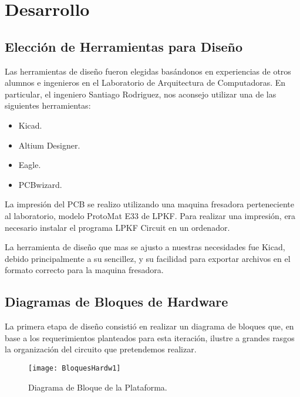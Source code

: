 
\section{Desarrollo} %
\label{it3:sec:desarrollo}

\subsection{Elección de Herramientas para Diseño} %
\label{it3:sub:herramientas_para_diseno}

Las herramientas de diseño fueron elegidas basándonos en experiencias de otros alumnos e ingenieros en el Laboratorio de Arquitectura de Computadoras. En particular, el ingeniero Santiago Rodriguez, nos aconsejo utilizar una de las siguientes herramientas:

\begin{itemize}
\item Kicad.
\item Altium Designer.
\item Eagle.
\item PCBwizard.
\end{itemize}

La impresión del PCB se realizo utilizando una maquina fresadora perteneciente al laboratorio, modelo ProtoMat E33 de LPKF. Para realizar una impresión, era necesario instalar el programa LPKF Circuit en un ordenador.

La herramienta de diseño que mas se ajusto a nuestras necesidades fue Kicad, debido principalmente a su sencillez, y su facilidad para exportar archivos en el formato correcto para la maquina fresadora.


\subsection{Diagramas de Bloques de Hardware}
\label{it3:sub:diagrama_de_bloques_de_hardware}

La primera etapa de diseño consistió en realizar un diagrama de bloques que, en base a los requerimientos planteados para esta iteración, ilustre a grandes rasgos la organización del circuito que pretendemos realizar.

\begin{figure}[h]
  \centering
  \texttt{[image: BloquesHardw1]}
  \caption{Diagrama de Bloque de la Plataforma.}\label{fig:BloquesHardw1}
\end{figure}

